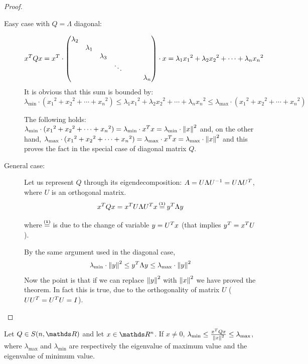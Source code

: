 \documentclass[computationalMathematics.tex]{subfiles}
\begin{document}
\begin{proof}
  \begin{description}
    \item[{\sc Easy case with $Q = \Lambda$ diagonal:}]
    
      \[{x}^{T}Qx = {x}^{T} \cdot \begin{pmatrix}
    \lambda_2\\
    &\lambda_1\\
    &&\lambda_3\\
    &&& \ddots\\
    &&&&&&\lambda_n\\
    \end{pmatrix}
      \cdot x = \lambda_1 {x_1}^2 + \lambda_2 {x_2}^2 + \cdots + \lambda_n {x_n}^2
      \]
  It is obvious that this sum is bounded by:
  \[
    \lambda_{\text{min}} \cdot ({x_1}^2 +{x_2}^2 + \cdots + {x_n}^2) \le  \lambda_1 {x_1}^2 + \lambda_2 {x_2}^2 + \cdots + \lambda_n {x_n}^2 \le \lambda_{\text{max}} \cdot ({x_1}^2 +{x_2}^2 + \cdots + {x_n}^2)
  \]

      The following holds: $ \lambda_{\text{min}} \cdot ({x_1}^2 +{x_2}^2 + \cdots + {x_n}^2) =  \lambda_{\text{min}} \cdot {x}^{T} x =  \lambda_{\text{min}} \cdot {\left\lVert x\right\rVert}^2$ and, on the other hand, $ \lambda_{\text{max}} \cdot ({x_1}^2 +{x_2}^2 + \cdots + {x_n}^2) =  \lambda_{\text{max}} \cdot {x}^{T} x =  \lambda_{\text{max}} \cdot {\left\lVert x\right\rVert}^2$ and this proves the fact in the special case of diagonal matrix $Q$.
    \item[{\sc General case:}]
      Let us represent $Q$ through its eigendecomposition: $A = U \Lambda {U}^{-1} = U \Lambda {U}^{T}$, where $U$ is an orthogonal matrix.
      \[
        \tr{x}Qx = \tr{x} U \Lambda \tr{U} x \numeq{(1)} \tr{y} \Lambda y
      \]

      where $\numeq{(1)}$ is due to the change of variable $y = {U}^{T} x$ (that implies ${y}^{T} = {x}^{T} U$).

      By the same argument used in the diagonal case,
      \[
        \lambda_{\text{min}} \cdot {\left\lVert y\right\rVert}^2 \le {y}^{T} \Lambda y \le \lambda_{\text{max}} \cdot {\left\lVert y\right\rVert}^2
      \]
      Now the point is that if we can replace ${\left\lVert y\right\rVert}^2$ with ${\left\lVert x\right\rVert}^2$ we have proved the theorem.
      In fact this is true, due to the orthogonality of matrix $U$ ($U{U}^{T} = {U}^{T}U = I$).
  \end{description}
\end{proof}

\begin{corollary}
  Let $Q \in S(n, \R)$ and let $x \in \R^n$. If $x \neq 0$, $\lambda_{\text{min}} \le \frac{{x}^{T}Qx}{{\left\lVert x\right\rVert}^2} \le \lambda_{\text{max}}$, where $\lambda_{\text{max}}$ and $\lambda_{\text{min}}$ are respectively the eigenvalue of maximum value and the eigenvalue of minimum value.
\end{corollary}
\end{document}
